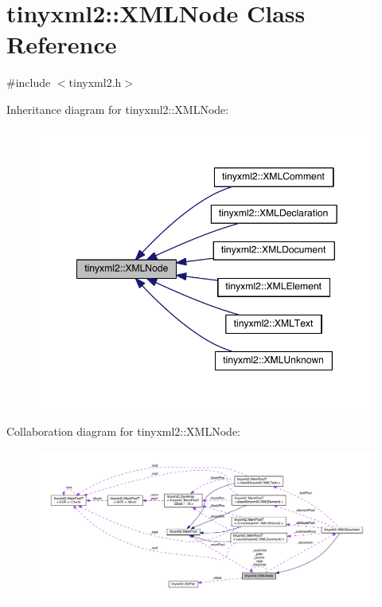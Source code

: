 \hypertarget{classtinyxml2_1_1_x_m_l_node}{}\section{tinyxml2\+:\+:X\+M\+L\+Node Class Reference}
\label{classtinyxml2_1_1_x_m_l_node}


{\ttfamily \#include $<$tinyxml2.\+h$>$}



Inheritance diagram for tinyxml2\+:\+:X\+M\+L\+Node\+:\nopagebreak
\begin{figure}[H]
\begin{center}
\leavevmode
\includegraphics[width=349pt]{classtinyxml2_1_1_x_m_l_node__inherit__graph}
\end{center}
\end{figure}


Collaboration diagram for tinyxml2\+:\+:X\+M\+L\+Node\+:\nopagebreak
\begin{figure}[H]
\begin{center}
\leavevmode
\includegraphics[width=350pt]{classtinyxml2_1_1_x_m_l_node__coll__graph}
\end{center}
\end{figure}
